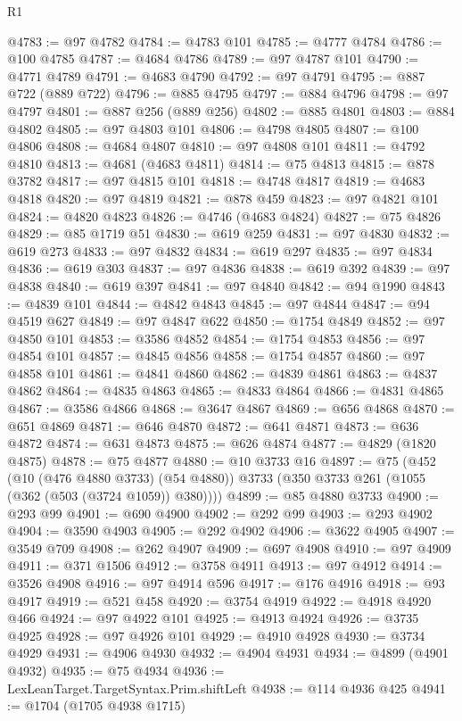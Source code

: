 \begin{lexlean}{R1}
\begin{coremodule}
@4783 := @97 @4782
@4784 := @4783 @101
@4785 := @4777 @4784
@4786 := @100 @4785
@4787 := @4684 @4786
@4789 := @97 @4787 @101
@4790 := @4771 @4789
@4791 := @4683 @4790
@4792 := @97 @4791
@4795 := @887 @722 (@889 @722)
@4796 := @885 @4795
@4797 := @884 @4796
@4798 := @97 @4797
@4801 := @887 @256 (@889 @256)
@4802 := @885 @4801
@4803 := @884 @4802
@4805 := @97 @4803 @101
@4806 := @4798 @4805
@4807 := @100 @4806
@4808 := @4684 @4807
@4810 := @97 @4808 @101
@4811 := @4792 @4810
@4813 := @4681 (@4683 @4811)
@4814 := @75 @4813
@4815 := @878 @3782
@4817 := @97 @4815 @101
@4818 := @4748 @4817
@4819 := @4683 @4818
@4820 := @97 @4819
@4821 := @878 @459
@4823 := @97 @4821 @101
@4824 := @4820 @4823
@4826 := @4746 (@4683 @4824)
@4827 := @75 @4826
@4829 := @85 @1719 @51
@4830 := @619 @259
@4831 := @97 @4830
@4832 := @619 @273
@4833 := @97 @4832
@4834 := @619 @297
@4835 := @97 @4834
@4836 := @619 @303
@4837 := @97 @4836
@4838 := @619 @392
@4839 := @97 @4838
@4840 := @619 @397
@4841 := @97 @4840
@4842 := @94 @1990
@4843 := @4839 @101
@4844 := @4842 @4843
@4845 := @97 @4844
@4847 := @94 @4519 @627
@4849 := @97 @4847 @622
@4850 := @1754 @4849
@4852 := @97 @4850 @101
@4853 := @3586 @4852
@4854 := @1754 @4853
@4856 := @97 @4854 @101
@4857 := @4845 @4856
@4858 := @1754 @4857
@4860 := @97 @4858 @101
@4861 := @4841 @4860
@4862 := @4839 @4861
@4863 := @4837 @4862
@4864 := @4835 @4863
@4865 := @4833 @4864
@4866 := @4831 @4865
@4867 := @3586 @4866
@4868 := @3647 @4867
@4869 := @656 @4868
@4870 := @651 @4869
@4871 := @646 @4870
@4872 := @641 @4871
@4873 := @636 @4872
@4874 := @631 @4873
@4875 := @626 @4874
@4877 := @4829 (@1820 @4875)
@4878 := @75 @4877
@4880 := @10 @3733 @16
@4897 := @75
    (@452
      (@10 (@476 @4880 @3733) (@54 @4880))
      @3733
      (@350 @3733 @261 (@1055 (@362 (@503 (@3724 @1059)) @380))))
@4899 := @85 @4880 @3733
@4900 := @293 @99
@4901 := @690 @4900
@4902 := @292 @99
@4903 := @293 @4902
@4904 := @3590 @4903
@4905 := @292 @4902
@4906 := @3622 @4905
@4907 := @3549 @709
@4908 := @262 @4907
@4909 := @697 @4908
@4910 := @97 @4909
@4911 := @371 @1506
@4912 := @3758 @4911
@4913 := @97 @4912
@4914 := @3526 @4908
@4916 := @97 @4914 @596
@4917 := @176 @4916
@4918 := @93 @4917
@4919 := @521 @458
@4920 := @3754 @4919
@4922 := @4918 @4920 @466
@4924 := @97 @4922 @101
@4925 := @4913 @4924
@4926 := @3735 @4925
@4928 := @97 @4926 @101
@4929 := @4910 @4928
@4930 := @3734 @4929
@4931 := @4906 @4930
@4932 := @4904 @4931
@4934 := @4899 (@4901 @4932)
@4935 := @75 @4934
@4936 := LexLeanTarget.TargetSyntax.Prim.shiftLeft
@4938 := @114 @4936 @425
@4941 := @1704 (@1705 @4938 @1715)

\end{coremodule}
\end{lexlean}
